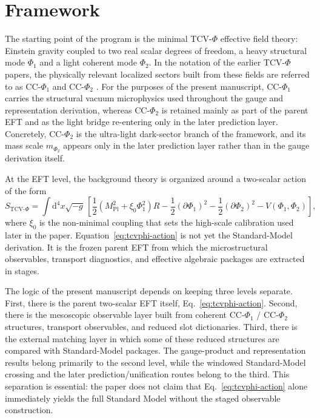 \documentclass[11pt]{article}
\newcommand{\dd}{\mathrm{d}}
\begin{document}
\section{Framework}
The starting point of the program is the minimal TCV-$\Phi$ effective field theory: Einstein gravity coupled to two real scalar degrees of freedom, a heavy structural mode $\Phi_1$ and a light coherent mode $\Phi_2$. In the notation of the earlier TCV-$\Phi$ papers, the physically relevant localized sectors built from these fields are referred to as CC-$\Phi_1$ and CC-$\Phi_2$ \cite{TCVPhiI,TCVPhiII,TCVPhiIX}. For the purposes of the present manuscript, CC-$\Phi_1$ carries the structural vacuum microphysics used throughout the gauge and representation derivation, whereas CC-$\Phi_2$ is retained mainly as part of the parent EFT and as the light bridge re-entering only in the later prediction layer. Concretely, CC-$\Phi_2$ is the ultra-light dark-sector branch of the framework, and its mass scale $m_{\Phi_2}$ appears only in the later prediction layer rather than in the gauge derivation itself.

At the EFT level, the background theory is organized around a two-scalar action of the form
\begin{equation}
S_{\mathrm{TCV}\text{-}\Phi}
=
\int \dd^4x \sqrt{-g}\,
\left[
\frac{1}{2}\left(M_{\mathrm{Pl}}^2+\xi_0 \Phi_1^2\right)R
-\frac{1}{2}(\partial\Phi_1)^2
-\frac{1}{2}(\partial\Phi_2)^2
-V(\Phi_1,\Phi_2)
\right],
\label{eq:tcvphi-action}
\end{equation}
where $\xi_0$ is the non-minimal coupling that sets the high-scale calibration used later in the paper. Equation~\eqref{eq:tcvphi-action} is not yet the Standard-Model derivation. It is the frozen parent EFT from which the microstructural observables, transport diagnostics, and effective algebraic packages are extracted in stages.

The logic of the present manuscript depends on keeping three levels separate. First, there is the parent two-scalar EFT itself, Eq.~\eqref{eq:tcvphi-action}. Second, there is the mesoscopic observable layer built from coherent CC-$\Phi_1$ / CC-$\Phi_2$ structures, transport observables, and reduced slot dictionaries. Third, there is the external matching layer in which some of these reduced structures are compared with Standard-Model packages. The gauge-product and representation results belong primarily to the second level, while the windowed Standard-Model crossing and the later prediction/unification routes belong to the third. This separation is essential: the paper does not claim that Eq.~\eqref{eq:tcvphi-action} alone immediately yields the full Standard Model without the staged observable construction.
\end{document}
